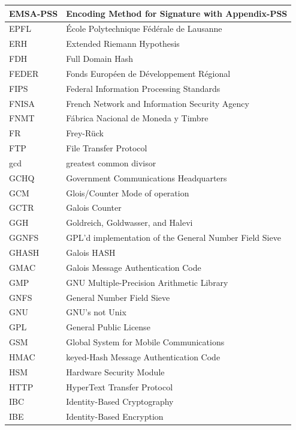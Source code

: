 \documentclass[a4paper, 12pt]{book} %
\begin{document}
\begin{longtable}{||lp{11cm}||}
    EMSA-PSS & Encoding Method for Signature with Appendix-PSS \\ \hline 
    EPFL & \'Ecole Polytechnique F\'ed\'erale de Lausanne \\ \hline 
    ERH & Extended Riemann Hypothesis \\ \hline 
    FDH & Full Domain Hash \\ \hline 
    FEDER & Fonds Europ\'een de D\'eveloppement R\'egional \\ \hline 
    FIPS & Federal Information Processing Standards \\ \hline 
    FNISA & French Network and Information Security Agency \\ \hline 
    FNMT & F\'abrica Nacional de Moneda y Timbre \\ \hline 
    FR & Frey-R\"uck \\ \hline 
    FTP & File Transfer Protocol \\ \hline 
    gcd & greatest common divisor \\ \hline 
    GCHQ & Government Communications Headquarters \\ \hline 
    GCM & Glois/Counter Mode of operation \\ \hline  
    GCTR & Galois Counter \\ \hline 
    GGH & Goldreich, Goldwasser, and Halevi  \\ \hline 
    GGNFS & GPL'd implementation of the General Number Field Sieve \\ \hline 
    GHASH & Galois HASH  \\ \hline 
    GMAC & Galois Message Authentication Code \\ \hline 
    GMP & GNU Multiple-Precision Arithmetic Library \\ \hline 
    GNFS & General Number Field Sieve \\ \hline 
    GNU & GNU's not Unix \\ \hline 
    GPL & General Public License \\ \hline 
    GSM & Global System for Mobile Communications \\ \hline 
    HMAC & keyed-Hash Message Authentication Code \\ \hline     
    HSM & Hardware Security Module \\ \hline 
    HTTP &  HyperText Transfer Protocol \\ \hline 
    IBC & Identity-Based Cryptography \\ \hline 
    IBE & Identity-Based Encryption \\ \hline 

\end{longtable}
\end{document}
